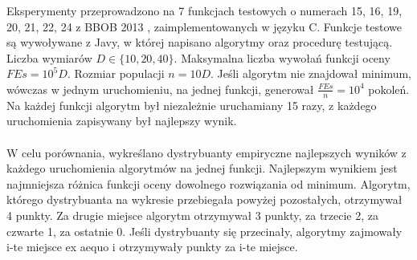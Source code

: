 \documentclass[12pt, a4paper]{article}
\begin{document}
Eksperymenty przeprowadzono na 7 funkcjach testowych o numerach 15, 16, 19, 20, 21, 22, 24 z BBOB 2013 \cite{finck, hansen}, 
zaimplementowanych w języku C.
Funkcje testowe są wywoływane z Javy, w której napisano algorytmy oraz procedurę testującą.
Liczba wymiarów $D \in \{10, 20, 40\}$. Maksymalna liczba wywołań funkcji oceny $FEs = 10^5D$. 
Rozmiar populacji $n = 10D$. Jeśli algorytm nie znajdował minimum, wówczas w jednym uruchomieniu, na jednej funkcji, 
generował $\frac{FEs}{n} = 10^4$ pokoleń. 
Na każdej funkcji algorytm był niezależnie uruchamiany 15 razy, z każdego uruchomienia zapisywany był najlepszy wynik. \\
\\
W celu porównania, wykreślano dystrybuanty empiryczne najlepszych wyników z każdego uruchomienia 
algorytmów na jednej funkcji. Najlepszym wynikiem jest najmniejsza różnica funkcji oceny dowolnego rozwiązania od minimum.
Algorytm, którego dystrybuanta na wykresie przebiegała powyżej pozostałych, otrzymywał 4 punkty. 
Za drugie miejsce algorytm otrzymywał 3 punkty, za trzecie 2, za czwarte 1, za ostatnie 0. 
Jeśli dystrybuanty się przecinały, algorytmy zajmowały i-te miejsce ex aequo i otrzymywały punkty za i-te miejsce.

\nocite{*}


\end{document}
